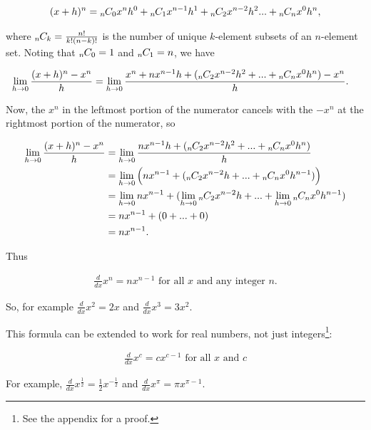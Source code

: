 \begin{align*}
    (x + h)^n = {{}_{n}\mkern-1muC_{0}} x^n h^0 + {{}_{n}\mkern-1muC_{1}} x^{n - 1} h^1 + {{}_{n}\mkern-1muC_{2}} x^{n - 2} h^2 ... + {{}_{n}\mkern-1muC_{n}} x^0 h^n,
\end{align*}

where ${{}_{n}\mkern-1muC_{k}} = \frac{n!}{k!(n - k)!}$ is the number of unique $k$-element subsets of an $n$-element set. Noting that ${{}_{n}\mkern-1muC_{0}} = 1$ and ${{}_{n}\mkern-1muC_{1}} = n$, we have

\begin{align*}
    \lim_{h \rightarrow 0} \frac{(x + h)^n - x^n}{h} &=
    \lim_{h \rightarrow 0} \frac{x^n + nx^{n - 1}h + ({{}_{n}\mkern-1muC_{2}} x^{n - 2} h^2 + ... + {{}_{n}\mkern-1muC_{n}} x^0 h^n) - x^n}{h}.
\end{align*}

Now, the $x^n$ in the leftmost portion of the numerator cancels with the $-x^n$ at the rightmost portion of the numerator, so

\begin{align*}
    \lim_{h \rightarrow 0} \frac{(x + h)^n - x^n}{h} &= 
    \lim_{h \rightarrow 0} \frac{nx^{n - 1}h + ({{}_{n}\mkern-1muC_{2}} x^{n - 2} h^2 + ... + {{}_{n}\mkern-1muC_{n}} x^0 h^n)}{h} \\
    &=
    \lim_{h \rightarrow 0} \Big( nx^{n - 1} + ({{}_{n}\mkern-1muC_{2}}x^{n - 2}h + ... + {{}_{n}\mkern-1muC_{n}}x^0h^{n - 1}) \Big) \\
    &= \lim_{h \rightarrow 0} nx^{n - 1} + (\lim_{h \rightarrow 0} {{}_{n}\mkern-1muC_{2}}x^{n - 2}h + ... + \lim_{h \rightarrow 0} {{}_{n}\mkern-1muC_{n}}x^0 h^{n - 1}) \\
    &= nx^{n - 1} + (0 + ... + 0) \\
    &= nx^{n - 1}.
\end{align*}

Thus

\begin{align*}
    \frac{d}{dx} x^n = nx^{n - 1} \text{ for all $x$ and any integer $n$}.
\end{align*}

So, for example $\frac{d}{dx} x^2 = 2x$ and $\frac{d}{dx} x^3 = 3x^2$. 

This formula can be extended to work for real numbers, not just integers\footnote{See the appendix for a proof.}:

\begin{align*}
    \boxed
    {
        \frac{d}{dx} x^c = cx^{c - 1} \text{ for all $x$ and $c$}
    }
\end{align*}

For example, $\frac{d}{dx} x^{\frac{1}{2}} = \frac{1}{2}x^{-\frac{1}{2}}$ and $\frac{d}{dx} x^\pi = \pi x^{\pi - 1}$.

